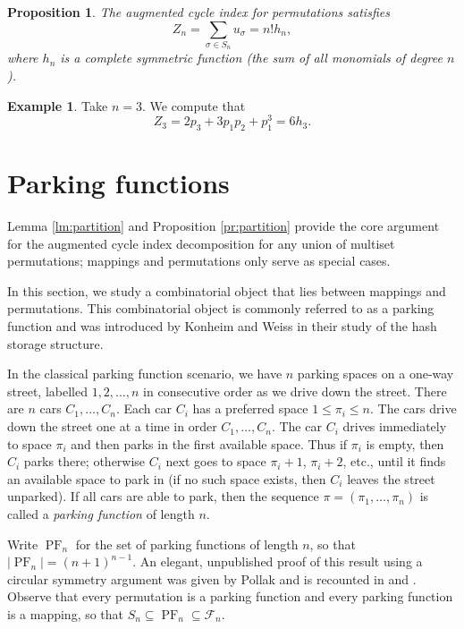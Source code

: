 \documentclass[letterpaper]{amsart}
\theoremstyle{plain}
\newtheorem{proposition}[theorem]{Proposition}
\theoremstyle{definition}
\newtheorem{example}[theorem]{Example}
\theoremstyle{remark}
\DeclareMathOperator{\PF}{PF}
\begin{document}
\begin{proposition}\label{pr:permutation-augmented}
The augmented cycle index for permutations satisfies
\[Z_n=\sum_{\sigma \in S_n} u_\sigma=n! h_n,\]
where $h_n$ is a complete symmetric function (the sum of all monomials of degree $n$).
\end{proposition}

\begin{example}
Take $n=3$. We compute that
\[Z_3=2p_3+3p_1p_2+p_1^3=6h_3.\]
\end{example}

\section{Parking functions}
\label{sec:parking}
Lemma \ref{lm:partition} and Proposition \ref{pr:partition} provide the core argument for the augmented cycle index decomposition for any union of multiset permutations; mappings and permutations only serve as special cases.

In this section, we study a combinatorial object that lies between mappings and permutations. This combinatorial object is commonly referred to as a parking function and was introduced by Konheim and Weiss \cite{Konheim1966} in their study of the hash storage structure.

In the classical parking
function scenario, we have $n$
parking spaces on a one-way street, labelled $1,2,\dots,n$ in
consecutive order as we drive down the street. There are $n$ cars
$C_1,\dots,C_n$. Each car $C_i$ has a preferred space $1\leq \pi_i\leq
n$. The cars drive down the street one at a time in order
$C_1,\dots, C_n$. The car $C_i$ drives immediately to space $\pi_i$ and
then parks in the first available space. Thus if $\pi_i$ is empty, then
$C_i$ parks there; otherwise $C_i$ next goes to space $\pi_i+1$, $\pi_i+2$, etc., until it finds an available space to park in (if no such space exists, then $C_i$ leaves the street unparked). If
all cars are able to park, then the sequence $\pi=(\pi_1,\dots, \pi_n)$ is
called a \emph{parking function} of length $n$.

Write $\PF_n$
for the set of parking functions of length $n$, so that $|\PF_n|=(n+1)^{n-1}$. An elegant, unpublished proof of this result using a circular symmetry argument was given by Pollak and is recounted in \cite{Foata1974} and \cite{Riordan1969}. Observe that every permutation is a parking function and every parking function is a mapping, so that $S_n \subseteq \PF_n \subseteq \mathcal{F}_n$. 
\end{document}
